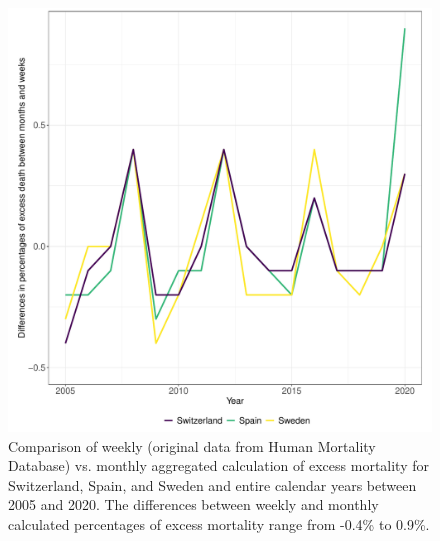 \documentclass{article}
\begin{document}
	\begin{figure}[H]
	\centering	
	\includegraphics[width=.7\linewidth]{../plot_appendix_week_month}
	\caption{Comparison of weekly (original data from Human Mortality Database) vs. monthly aggregated calculation of excess mortality for Switzerland, Spain, and Sweden and entire calendar years between 2005 and 2020. The differences between weekly and monthly calculated percentages of excess mortality range from -0.4\% to 0.9\%. }
\end{figure}


	
	\clearpage
	
	
	
	
	
\end{document}
